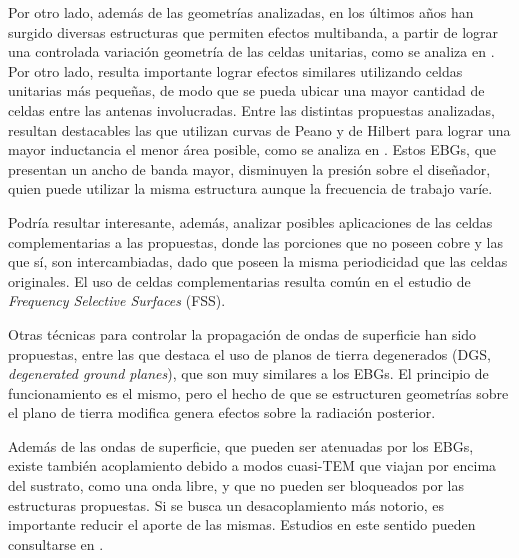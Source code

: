 Por otro lado, además de las geometrías analizadas, en los últimos años han surgido diversas estructuras que permiten efectos multibanda, a partir de lograr una controlada variación geometría de las celdas unitarias, como se analiza en \cite{Kern:multiband}. Por otro lado, resulta importante lograr efectos similares utilizando celdas unitarias más pequeñas, de modo que se pueda ubicar una mayor cantidad de celdas entre las antenas involucradas. Entre las distintas propuestas analizadas, resultan destacables las que utilizan curvas de Peano y de Hilbert para lograr una mayor inductancia el menor área posible, como se analiza en \cite{McVay:Peano}. Estos EBGs, que presentan un ancho de banda mayor, disminuyen la presión sobre el diseñador, quien puede utilizar la misma estructura aunque la frecuencia de trabajo varíe.

Podría resultar interesante, además, analizar posibles aplicaciones de las celdas complementarias a las propuestas, donde las porciones que no poseen cobre y las que sí, son intercambiadas, dado que poseen la misma periodicidad que las celdas originales. El uso de celdas complementarias resulta común en el estudio de \textit{Frequency Selective Surfaces} (FSS).

Otras técnicas para controlar la propagación de ondas de superficie han sido propuestas, entre las que destaca el uso de planos de tierra degenerados (DGS, \textit{degenerated ground planes}), que son muy similares a los EBGs. El principio de funcionamiento es el mismo, pero el hecho de que se estructuren geometrías sobre el plano de tierra modifica genera efectos sobre la radiación posterior.

Además de las ondas de superficie, que pueden ser atenuadas por los EBGs, existe también acoplamiento debido a modos cuasi-TEM que viajan por encima del sustrato, como una onda libre, y que no pueden ser bloqueados por las estructuras propuestas. Si se busca un desacoplamiento más notorio, es importante reducir el aporte de las mismas. Estudios en este sentido pueden consultarse en \cite{Asimonis:designoptimization}.



